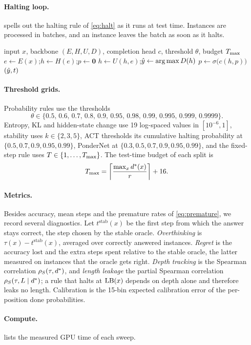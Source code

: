\paragraph{Halting loop.}  spells out the halting rule of \cref{eq:halt} as it runs at
test time. Instances are processed in batches, and an instance leaves the batch as soon as it halts.

\begin{algorithm}[h]
  \caption{Halting with local completion heads (batched; halted instances leave the batch).}
  \label{alg:halt}
  \begin{algorithmic}[1]
    \Require input $x$, backbone $(E,H,U,D)$, completion head $c$, threshold $\theta$, budget $\Tmax$
    \State $e \gets E(x)$;\quad $h \gets H(e)$;\quad $p \gets \mathbf 0$
      \State $h \gets U(h, e)$;\quad $\yhat \gets \arg\max D(h)$
      \State $p \gets \sigma\bigl(c(h, p)\bigr)$ 
        \State \Return $(\yhat, t)$
      \EndIf
    \EndFor
  \end{algorithmic}
\end{algorithm}

\paragraph{Threshold grids.} Probability rules use the thresholds
\begin{equation*}
  \theta\in\{0.5,\,0.6,\,0.7,\,0.8,\,0.9,\,0.95,\,0.98,\,0.99,\,0.995,\,0.999,\,0.9999\}.
\end{equation*}
Entropy, KL and hidden-state change
use 19 log-spaced values in $[10^{-6},1]$, stability uses $k\in\{2,3,5\}$, ACT thresholds its cumulative
halting probability at $\{0.5,0.7,0.9,0.95,0.99\}$, PonderNet at $\{0.3,0.5,0.7,0.9,0.95,0.99\}$, and the
fixed-step rule uses $T\in\{1,\dots,\Tmax\}$. The test-time budget of each split is
\begin{equation*}
  \Tmax = \ceil*{\frac{\max_x \dstar(x)}{r}} + 16.
\end{equation*}

\paragraph{Metrics.} Besides accuracy, mean steps and the premature rates of \cref{eq:premature}, we
record several diagnostics. Let $t^{\mathrm{stab}}(x)$ be the first step from which the answer stays
correct, the step chosen by the stable oracle. \emph{Overthinking} is
$\tau(x)-t^{\mathrm{stab}}(x)$, averaged over correctly answered instances. \emph{Regret} is the accuracy
lost and the extra steps spent relative to the stable oracle, the latter measured on instances that the
oracle gets right. \emph{Depth tracking} is the Spearman correlation $\rho_S(\tau,\dstar)$, and
\emph{length leakage} the partial Spearman correlation $\rho_S(\tau, L\mid\dstar)$; a rule that halts at
$\LB(x)$ depends on depth alone and therefore leaks no length. Calibration is the 15-bin expected
calibration error of the per-position done probabilities.

\paragraph{Compute.}  lists the measured GPU time of each sweep.


